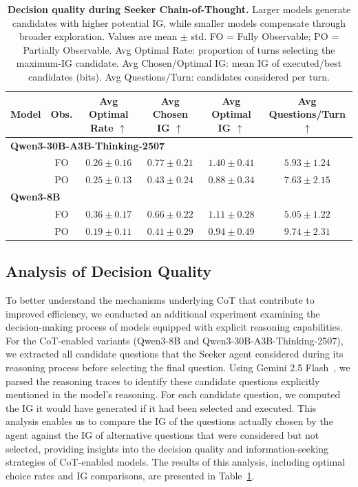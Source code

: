 \documentclass[letterpaper]{article} %
\begin{document}
\begin{table}[t]
\centering
\setlength{\tabcolsep}{1.0mm}
\small
\begin{tabular}{lccccc}
\toprule
\textbf{Model} & \textbf{Obs.} & \textbf{Avg Optimal Rate} $\uparrow$ & \textbf{Avg Chosen IG} $\uparrow$ & \textbf{Avg Optimal IG} $\uparrow$ & \textbf{Avg Questions/Turn} $\uparrow$ \\
\midrule
\multicolumn{6}{l}{\textbf{Qwen3-30B-A3B-Thinking-2507}} \\
 & FO & $0.26 \pm 0.16$ & $0.77 \pm 0.21$ & $1.40 \pm 0.41$ & $5.93 \pm 1.24$ \\
 & PO & $0.25 \pm 0.13$ & $0.43 \pm 0.24$ & $0.88 \pm 0.34$ & $7.63 \pm 2.15$ \\
\midrule
\multicolumn{6}{l}{\textbf{Qwen3-8B}} \\
 & FO & $0.36 \pm 0.17$ & $0.66 \pm 0.22$ & $1.11 \pm 0.28$ & $5.05 \pm 1.22$ \\
 & PO & $0.19 \pm 0.11$ & $0.41 \pm 0.29$ & $0.94 \pm 0.49$ & $9.74 \pm 2.31$ \\
\bottomrule
\end{tabular}
\caption{\textbf{Decision quality during Seeker Chain-of-Thought.} Larger models generate candidates with higher potential IG, while smaller models compensate through broader exploration. Values are mean $\pm$ std. FO = Fully Observable; PO = Partially Observable. Avg Optimal Rate: proportion of turns selecting the maximum-IG candidate. Avg Chosen/Optimal IG: mean IG of executed/best candidates (bits). Avg Questions/Turn: candidates considered per turn.}
\label{tab:optimal_choice}
\end{table}

\subsection{Analysis of Decision Quality}

To better understand the mechanisms underlying CoT that contribute to improved efficiency, we conducted an additional experiment examining the decision-making process of models equipped with explicit reasoning capabilities. For the CoT-enabled variants (Qwen3-8B and Qwen3-30B-A3B-Thinking-2507), we extracted all candidate questions that the Seeker agent considered during its reasoning process before selecting the final question. Using Gemini 2.5 Flash~\cite{comanici2025gemini25pushingfrontier}, we parsed the reasoning traces to identify these candidate questions explicitly mentioned in the model's reasoning. For each candidate question, we computed the IG it would have generated if it had been selected and executed. This analysis enables us to compare the IG of the questions actually chosen by the agent against the IG of alternative questions that were considered but not selected, providing insights into the decision quality and information-seeking strategies of CoT-enabled models. The results of this analysis, including optimal choice rates and IG comparisons, are presented in Table~\ref{tab:optimal_choice}.
\end{document}
